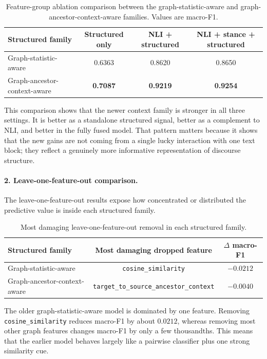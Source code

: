 \documentclass[11pt,a4paper]{article}
\begin{document}
\begin{table}[H]
\centering
\caption{Feature-group ablation comparison between the graph-statistic-aware and graph-ancestor-context-aware families. Values are macro-F1.}
\label{tab:structured_ablation_family_compare}
\begin{tabular}{lccc}
\toprule
Structured family & Structured only & NLI + structured & NLI + stance + structured \\
\midrule
Graph-statistic-aware & 0.6363 & 0.8620 & 0.8650 \\
Graph-ancestor-context-aware & \textbf{0.7087} & \textbf{0.9219} & \textbf{0.9254} \\
\bottomrule
\end{tabular}
\end{table}

This comparison shows that the newer context family is stronger in all three settings. It is better as a standalone structured signal, better as a complement to NLI, and better in the fully fused model. That pattern matters because it shows that the new gains are not coming from a single lucky interaction with one text block; they reflect a genuinely more informative representation of discourse structure.

\paragraph{2. Leave-one-feature-out comparison.}
The leave-one-feature-out results expose how concentrated or distributed the predictive value is inside each structured family.

\begin{table}[H]
\centering
\caption{Most damaging leave-one-feature-out removal in each structured family.}
\label{tab:structured_ablation_loo_compare}
\begin{tabular}{lcc}
\toprule
Structured family & Most damaging dropped feature & \(\Delta\) macro-F1 \\
\midrule
Graph-statistic-aware & \texttt{cosine\_similarity} & \(-0.0212\) \\
Graph-ancestor-context-aware & \texttt{target\_to\_source\_ancestor\_context} & \(-0.0040\) \\
\bottomrule
\end{tabular}
\end{table}

The older graph-statistic-aware model is dominated by one feature. Removing \texttt{cosine\_similarity} reduces macro-F1 by about \(0.0212\), whereas removing most other graph features changes macro-F1 by only a few thousandths. This means that the earlier model behaves largely like a pairwise classifier plus one strong similarity cue.
\end{document}
